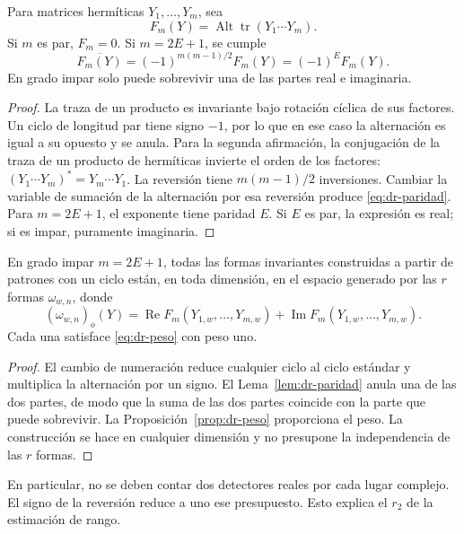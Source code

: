 \begin{lema}
\label{lem:dr-paridad}
Para matrices hermíticas $Y_1,\ldots,Y_m$, sea
\[
 F_m(Y)=\operatorname{Alt}\operatorname{tr}(Y_1\cdots Y_m).
\]
Si $m$ es par, $F_m=0$. Si $m=2E+1$, se cumple
\begin{equation}
 \overline{F_m(Y)}=(-1)^{m(m-1)/2}F_m(Y)=(-1)^E F_m(Y).
 \label{eq:dr-paridad}
\end{equation}
En grado impar solo puede sobrevivir una de las partes real e imaginaria.
\end{lema}
\begin{proof}
La traza de un producto es invariante bajo rotación cíclica de sus factores. Un ciclo de longitud par tiene signo $-1$, por lo que en ese caso la alternación es igual a su opuesto y se anula. Para la segunda afirmación, la conjugación de la traza de un producto de hermíticas invierte el orden de los factores: $(Y_1\cdots Y_m)^*=Y_m\cdots Y_1$. La reversión tiene $m(m-1)/2$ inversiones. Cambiar la variable de sumación de la alternación por esa reversión produce \eqref{eq:dr-paridad}. Para $m=2E+1$, el exponente tiene paridad $E$. Si $E$ es par, la expresión es real; si es impar, puramente imaginaria.
\end{proof}

\begin{proposicion}
\label{prop:dr-uno}
En grado impar $m=2E+1$, todas las formas invariantes construidas a partir de patrones con un ciclo están, en toda dimensión, en el espacio generado por las $r$ formas $\omega_{w,n}$, donde
\begin{equation}
 (\omega_{w,n})_o(Y)=\operatorname{Re}F_m(Y_{1,w},\ldots,Y_{m,w})
             +\operatorname{Im}F_m(Y_{1,w},\ldots,Y_{m,w}).
 \label{eq:dr-uno}
\end{equation}
Cada una satisface \eqref{eq:dr-peso} con peso uno.
\end{proposicion}
\begin{proof}
El cambio de numeración reduce cualquier ciclo al ciclo estándar y multiplica la alternación por un signo. El Lema~\ref{lem:dr-paridad} anula una de las dos partes, de modo que la suma de las dos partes coincide con la parte que puede sobrevivir. La Proposición~\ref{prop:dr-peso} proporciona el peso. La construcción se hace en cualquier dimensión y no presupone la independencia de las $r$ formas.
\end{proof}

En particular, no se deben contar dos detectores reales por cada lugar complejo. El signo de la reversión reduce a uno ese presupuesto. Esto explica el $r_2$ de la estimación de rango.

